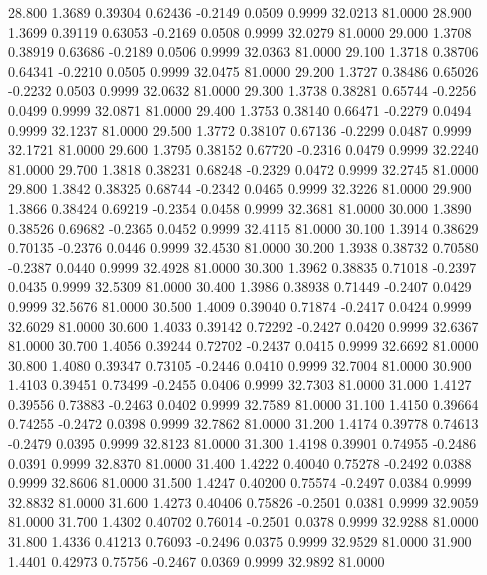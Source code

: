   28.800   1.3689   0.39304   0.62436  -0.2149   0.0509   0.9999  32.0213  81.0000
  28.900   1.3699   0.39119   0.63053  -0.2169   0.0508   0.9999  32.0279  81.0000
  29.000   1.3708   0.38919   0.63686  -0.2189   0.0506   0.9999  32.0363  81.0000
  29.100   1.3718   0.38706   0.64341  -0.2210   0.0505   0.9999  32.0475  81.0000
  29.200   1.3727   0.38486   0.65026  -0.2232   0.0503   0.9999  32.0632  81.0000
  29.300   1.3738   0.38281   0.65744  -0.2256   0.0499   0.9999  32.0871  81.0000
  29.400   1.3753   0.38140   0.66471  -0.2279   0.0494   0.9999  32.1237  81.0000
  29.500   1.3772   0.38107   0.67136  -0.2299   0.0487   0.9999  32.1721  81.0000
  29.600   1.3795   0.38152   0.67720  -0.2316   0.0479   0.9999  32.2240  81.0000
  29.700   1.3818   0.38231   0.68248  -0.2329   0.0472   0.9999  32.2745  81.0000
  29.800   1.3842   0.38325   0.68744  -0.2342   0.0465   0.9999  32.3226  81.0000
  29.900   1.3866   0.38424   0.69219  -0.2354   0.0458   0.9999  32.3681  81.0000
  30.000   1.3890   0.38526   0.69682  -0.2365   0.0452   0.9999  32.4115  81.0000
  30.100   1.3914   0.38629   0.70135  -0.2376   0.0446   0.9999  32.4530  81.0000
  30.200   1.3938   0.38732   0.70580  -0.2387   0.0440   0.9999  32.4928  81.0000
  30.300   1.3962   0.38835   0.71018  -0.2397   0.0435   0.9999  32.5309  81.0000
  30.400   1.3986   0.38938   0.71449  -0.2407   0.0429   0.9999  32.5676  81.0000
  30.500   1.4009   0.39040   0.71874  -0.2417   0.0424   0.9999  32.6029  81.0000
  30.600   1.4033   0.39142   0.72292  -0.2427   0.0420   0.9999  32.6367  81.0000
  30.700   1.4056   0.39244   0.72702  -0.2437   0.0415   0.9999  32.6692  81.0000
  30.800   1.4080   0.39347   0.73105  -0.2446   0.0410   0.9999  32.7004  81.0000
  30.900   1.4103   0.39451   0.73499  -0.2455   0.0406   0.9999  32.7303  81.0000
  31.000   1.4127   0.39556   0.73883  -0.2463   0.0402   0.9999  32.7589  81.0000
  31.100   1.4150   0.39664   0.74255  -0.2472   0.0398   0.9999  32.7862  81.0000
  31.200   1.4174   0.39778   0.74613  -0.2479   0.0395   0.9999  32.8123  81.0000
  31.300   1.4198   0.39901   0.74955  -0.2486   0.0391   0.9999  32.8370  81.0000
  31.400   1.4222   0.40040   0.75278  -0.2492   0.0388   0.9999  32.8606  81.0000
  31.500   1.4247   0.40200   0.75574  -0.2497   0.0384   0.9999  32.8832  81.0000
  31.600   1.4273   0.40406   0.75826  -0.2501   0.0381   0.9999  32.9059  81.0000
  31.700   1.4302   0.40702   0.76014  -0.2501   0.0378   0.9999  32.9288  81.0000
  31.800   1.4336   0.41213   0.76093  -0.2496   0.0375   0.9999  32.9529  81.0000
  31.900   1.4401   0.42973   0.75756  -0.2467   0.0369   0.9999  32.9892  81.0000
